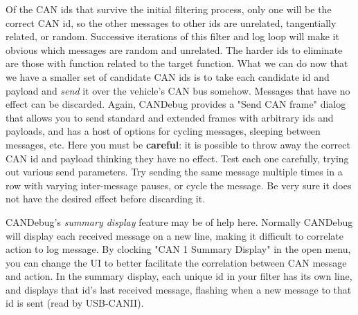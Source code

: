\documentclass[12pt]{article}
\begin{document}
Of the CAN ids that survive the initial filtering process, only one will be the correct
CAN id, so the other messages to other ids are unrelated, tangentially related,
or random. Successive iterations of this filter and log loop will make it
obvious which messages are random and unrelated. The harder ids to eliminate
are those with function related to the target function. What we can  do now
that we have a smaller set of candidate CAN ids is to take each candidate id
and payload and \textit{send} it over the vehicle's CAN bus somehow. Messages
that have no effect can be discarded. Again, CANDebug provides a "Send CAN
frame" dialog that allows you to send standard and extended frames with
arbitrary ids and payloads, and has a host of options for cycling messages,
sleeping between messages, etc. Here you must be \textbf{careful}: it is
possible to throw away the correct CAN id and payload thinking they have no
effect. Test each one carefully, trying out various send parameters. Try
sending the same message multiple times in a row with varying inter-message
pauses, or cycle the message. Be very sure it does not have the desired effect
before discarding it. 

CANDebug's \textit{summary display} feature may be of help here. Normally
CANDebug will display each received message on a new line, making it difficult
to correlate action to log message. By clocking "CAN 1 Summary Display" in the
open menu, you can change the UI to better facilitate the correlation between
CAN message and action. In the summary display, each unique id in your filter
has its own line, and displays that id's last received message, flashing when
a new message to that id is sent (read by USB-CANII). 
\end{document}
